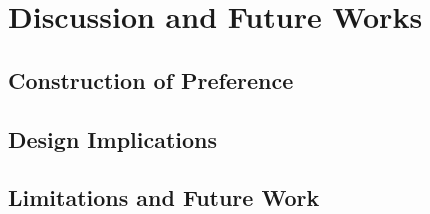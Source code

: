 \section{Discussion and Future Works}
\label{sec:discussion}

\subsection{Construction of Preference}





\subsection{Design Implications}

\subsection{Limitations and Future Work}
